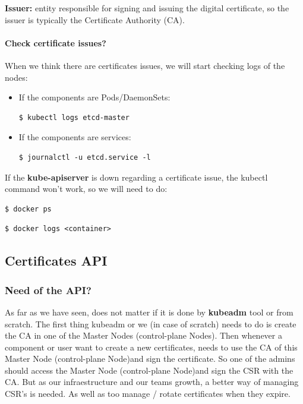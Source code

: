 \documentclass{article}
\newenvironment{blocktemplateIII}[1]{%
    \tcolorbox[beamer,%
    noparskip,breakable,
    ,colframe=Red,%
    colbacklower=LimeGreen!75!LightGreen,%
    title=#1]}%
    {\endtcolorbox}
\newenvironment{codetemplate}[1][]{%
  \mybasecolorbox[#1]
  \itshape
}{%
  \endmybasecolorbox
}
\begin{document}
\textbf{Issuer:} entity responsible for signing and issuing the digital certificate, so the issuer is typically the Certificate Authority (CA). 

\paragraph{Check certificate issues?}
When we think there are certificates issues, we will start checking logs of the nodes:
\begin{itemize}
    \item If the components are Pods/DaemonSets:
\begin{codetemplate}{}
\begin{verbatim}
$ kubectl logs etcd-master
\end{verbatim}
\end{codetemplate}
    \item If the components are services:
\begin{codetemplate}{}
\begin{verbatim}
$ journalctl -u etcd.service -l
\end{verbatim}
\end{codetemplate}
\end{itemize}

\begin{blocktemplateIII}{WARNING}
If the \textbf{kube-apiserver} is down regarding a certificate issue, the kubectl command won't work, so we will need to do:
\begin{codetemplate}{}
\begin{verbatim}
$ docker ps
\end{verbatim}
\end{codetemplate}
\begin{codetemplate}{}
\begin{verbatim}
$ docker logs <container>
\end{verbatim}
\end{codetemplate}
\end{blocktemplateIII}

\subsection{Certificates API}

\subsubsection{Need of the API?}
As far as we have seen, does not matter if it is done by \textbf{kubeadm} tool or from scratch. The first thing kubeadm or we (in case of scratch) needs to do
is create the CA in one of the Master Nodes (control-plane Nodes). Then whenever a component or user want to create a new certificates, needs to use the CA of this Master Node (control-plane Node)and sign the certificate.
So one of the admins should access the Master Node (control-plane Node)and sign the CSR with the CA.
But as our infraestructure and our teams growth, a better way of managing CSR's is needed. As well as too manage / rotate certificates when they expire.
\end{document}
